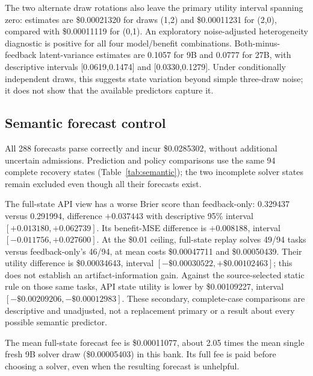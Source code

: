 \documentclass[10pt,twocolumn]{article}
\begin{document}
The two alternate draw rotations also leave the primary utility interval
spanning zero: estimates are \$0.00021320 for draws (1,2) and \$0.00011231 for
(2,0), compared with \$0.00011119 for (0,1). An exploratory noise-adjusted
heterogeneity diagnostic is positive for all four model/benefit combinations.
Both-minus-feedback latent-variance estimates are 0.1057 for 9B and 0.0777 for
27B, with descriptive intervals [0.0619,0.1474] and [0.0330,0.1279]. Under
conditionally independent draws, this suggests state variation beyond simple
three-draw noise; it does not show that the available predictors capture it.

\subsection{Semantic forecast control}
\begin{table}[t]
\centering\small
\caption{Prespecified API forecast control, restricted to tasks with all
three forecast views and all thirty recovery observations. Success and cost
use two-draw replay at \$0.01, including the producer and forecaster fees.
Cost is USD $\times1{,}000$ per failed task.}
\label{tab:semantic}

\end{table}
All 288 forecasts parse correctly and incur \$0.0285302, without additional
uncertain admissions. Prediction and policy comparisons use the same 94 complete
recovery states (Table~\ref{tab:semantic}); the two incomplete solver states
remain excluded even though all their forecasts exist.

The full-state API view has a worse Brier score than feedback-only:
0.329437 versus 0.291994, difference $+0.037443$ with descriptive 95\% interval
$[+0.013180,+0.062739]$. Its benefit-MSE difference is $+0.008188$, interval
$[-0.011756,+0.027600]$. At the \$0.01 ceiling, full-state replay solves 49/94
tasks versus feedback-only's 46/94, at mean costs \$0.00047711 and
\$0.00050439. Their utility difference is \$0.00034643, interval
$[-\$0.00030522,+\$0.00102463]$; this does not establish an artifact-information
gain. Against the source-selected static rule on those same tasks, API state
utility is lower by \$0.00109227, interval
$[-\$0.00209206,-\$0.00012983]$. These secondary, complete-case comparisons are
descriptive and unadjusted, not a replacement primary or a result about every
possible semantic predictor.

The mean full-state forecast fee is \$0.00011077, about 2.05 times the mean
single fresh 9B solver draw (\$0.00005403) in this bank. Its full fee is paid
before choosing a solver, even when the resulting forecast is unhelpful.
\end{document}

